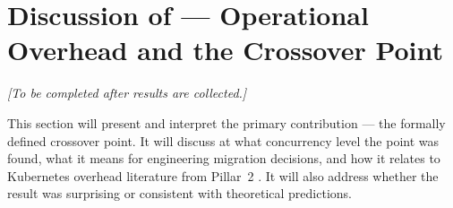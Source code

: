 \section{Discussion of  --- Operational Overhead and the Crossover Point}

\textit{[To be completed after results are collected.]}

This section will present and interpret the primary contribution --- the formally defined
crossover point. It will discuss at what concurrency level the point was found, what it
means for engineering migration decisions, and how it relates to Kubernetes overhead
literature from Pillar~2 \citep{cilic2023, liu2024}. It will also address whether the
result was surprising or consistent with theoretical predictions.
